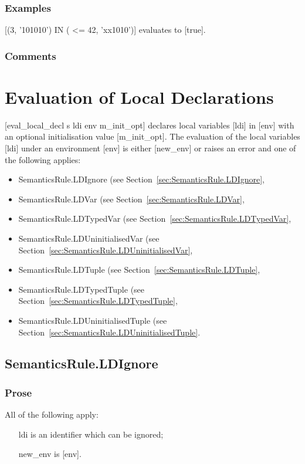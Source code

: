 \documentclass{book}
\begin{document}
    \subsection{Examples}
    [(3, '101010') IN {( <= 42, 'xx1010')}] evaluates to [true].

    \subsection{Comments}

\chapter{Evaluation of Local Declarations \label{chap:eval_local_decl}}

[eval\_local\_decl s ldi env m\_init\_opt] declares local variables [ldi] in
[env] with an optional initialisation value [m\_init\_opt].  The evaluation of
the local variables [ldi] under an environment [env] is either [new\_env] or
raises an error and one of the following applies:
\begin{itemize}
\item SemanticsRule.LDIgnore (see Section~\ref{sec:SemanticsRule.LDIgnore},
\item SemanticsRule.LDVar (see Section~\ref{sec:SemanticsRule.LDVar},
\item SemanticsRule.LDTypedVar (see Section~\ref{sec:SemanticsRule.LDTypedVar},
\item SemanticsRule.LDUninitialisedVar (see Section~\ref{sec:SemanticsRule.LDUninitialisedVar},
\item SemanticsRule.LDTuple (see Section~\ref{sec:SemanticsRule.LDTuple},
\item SemanticsRule.LDTypedTuple (see Section~\ref{sec:SemanticsRule.LDTypedTuple},
\item SemanticsRule.LDUninitialisedTuple (see Section~\ref{sec:SemanticsRule.LDUninitialisedTuple}.
\end{itemize}

\section{SemanticsRule.LDIgnore \label{sec:SemanticsRule.LDIgnore}}

    \subsection{Prose}
    All of the following apply:
    \begin{itemize}
    \item [ldi] is an identifier which can be ignored;
    \item [new\_env] is [env].
    \end{itemize}
\end{document}
